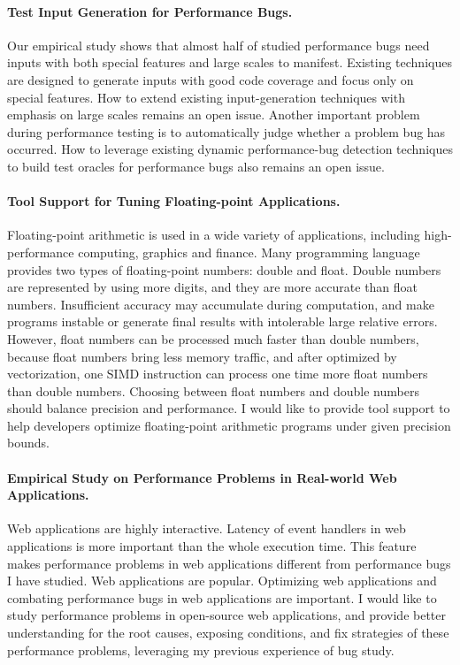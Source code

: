\documentclass[10pt]{article}
\begin{document}
\paragraph{Test Input Generation for Performance Bugs.}
Our empirical study shows that almost half of studied performance bugs need inputs with both special features and large scales to manifest. 
Existing techniques are designed to generate inputs with good code coverage and focus only on special features.
How to extend existing input-generation techniques with emphasis on large scales remains an open issue. 
Another important problem during performance testing is to automatically judge whether a problem bug has occurred. 
How to leverage existing dynamic performance-bug detection techniques to build test oracles for performance bugs also remains an open issue.

\paragraph{Tool Support for Tuning Floating-point Applications.}
Floating-point arithmetic is used in a wide variety of applications, 
including high-performance computing, graphics and finance. 
Many programming language provides two types of floating-point numbers: double and float. 
Double numbers are represented by using more digits, and they are more accurate than float numbers. 
Insufficient accuracy may accumulate during computation, 
and make programs instable or generate final results with intolerable large relative errors. 
However, float numbers can be processed much faster than double numbers, 
because float numbers bring less memory traffic, 
and after optimized by vectorization, one SIMD instruction can process one time more float numbers than double numbers. 
Choosing between float numbers and double numbers should balance precision and performance. 
I would like to provide tool support to help developers optimize floating-point arithmetic programs under given precision bounds. 

\paragraph{Empirical Study on  Performance Problems in Real-world Web Applications.}
Web applications are highly interactive. 
Latency of event handlers in web applications is more important than the whole execution time. 
This feature makes performance problems in web applications different from performance bugs I have studied. 
Web applications are popular. 
Optimizing web applications and combating performance bugs in web applications are important. 
I would like to study performance problems in open-source web applications, 
and provide better understanding for the root causes, 
exposing conditions, and fix strategies of these performance problems, 
leveraging my previous experience of bug study. 







\newpage


\end{document}
